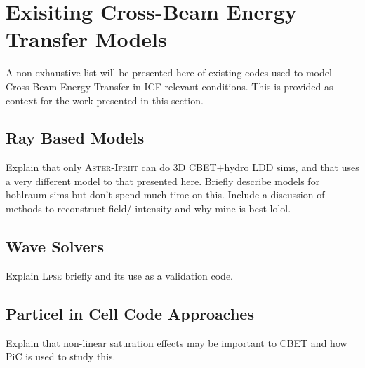 \section{Exisiting Cross-Beam Energy Transfer Models}

A non-exhaustive list will be presented here of existing codes used to model Cross-Beam Energy Transfer in ICF relevant conditions.
This is provided as context for the work presented in this section.

\subsection{Ray Based Models}

Explain that only \textsc{Aster}-\textsc{Ifriit} can do 3D CBET+hydro LDD sims, and that uses a very different model to that presented here.
Briefly describe models for hohlraum sims but don't spend much time on this.
Include a discussion of methods to reconstruct field/ intensity and why mine is best lolol.

\subsection{Wave Solvers}

Explain \textsc{Lpse} briefly and its use as a validation code.

\subsection{Particel in Cell Code Approaches}

Explain that non-linear saturation effects may be important to CBET and how PiC is used to study this.


